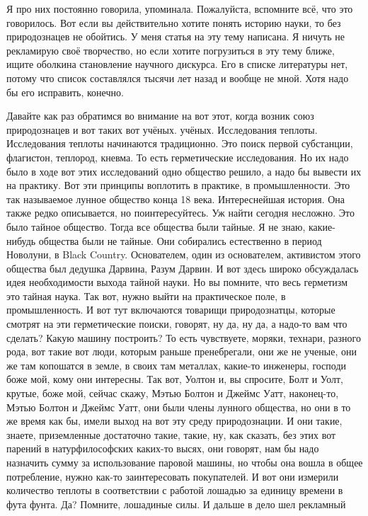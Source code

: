 Я про них постоянно говорила, упоминала. Пожалуйста,
вспомните всё, что это говорилось. Вот если вы действительно хотите понять
историю науки, то без природознацев не обойтись. У меня статья на эту тему
написана. Я ничуть не рекламирую своё творчество, но если хотите погрузиться в
эту тему ближе, ищите оболкина становление научного дискурса. Его в списке
литературы нет, потому что список составлялся тысячи лет назад и вообще не мной.
Хотя надо бы его исправить, конечно. 

Давайте как раз обратимся во внимание на
вот этот, когда возник союз природознацев и вот таких вот учёных. учёных.
Исследования теплоты. Исследования теплоты начинаются традиционно. Это поиск
первой субстанции, флагистон, теплород, кневма. То есть герметические
исследования. Но их надо было в ходе вот этих исследований одно общество решило,
а надо бы вывести их на практику. Вот эти принципы воплотить в практике, в
промышленности. Это так называемое лунное общество конца 18 века. Интереснейшая
история. Она также редко описывается, но поинтересуйтесь. Уж найти сегодня
несложно. Это было тайное общество. Тогда все общества были тайные. Я не знаю,
какие-нибудь общества были не тайные. Они собирались естественно в период
Новолуни, в Black Country. Основателем, один из основателем, активистом этого
общества был дедушка Дарвина, Разум Дарвин. И вот здесь широко обсуждалась идея
необходимости выхода тайной науки. Но вы помните, что весь герметизм это тайная
наука. Так вот, нужно выйти на практическое поле, в промышленность. И вот тут
включаются товарищи природознатцы, которые смотрят на эти герметические поиски,
говорят, ну да, ну да, а надо-то вам что сделать? Какую машину построить? То
есть чувствуете, моряки, технари, разного рода, вот такие вот люди, которым
раньше пренебрегали, они же не ученые, они же там копошатся в земле, в своих там
металлах, какие-то инженеры, господи боже мой, кому они интересны. Так вот,
Уолтон и, вы спросите, Болт и Уолт, крутые, боже мой, сейчас скажу, Мэтью Болтон
и Джеймс Уатт, наконец-то, Мэтью Болтон и Джеймс Уатт, они были члены лунного
общества, но они в то же время как бы, имели выход на вот эту среду
природознации. И они такие, знаете, приземленные достаточно такие, такие, ну,
как сказать, без этих вот парений в натурфилософских каких-то высях, они
говорят, нам бы надо назначить сумму за использование паровой машины, но чтобы
она вошла в общее потребление, нужно как-то заинтересовать покупателей. И вот
они измерили количество теплоты в соответствии с работой лошадью за единицу
времени в фута фунта. Да? Помните, лошадиные силы. И дальше в дело шел рекламный
